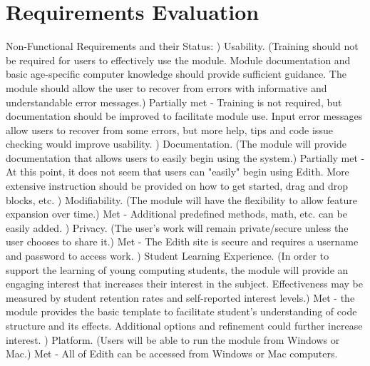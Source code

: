 \documentclass[a4paper]{article}
\begin{document}
\section{Requirements Evaluation}

Non-Functional Requirements and their Status: \newline {}) Usability.  (Training should not be required for users to effectively use the module.  
Module documentation and basic age-specific computer knowledge should provide sufficient guidance.
The module should allow the user to recover from errors with informative and understandable error messages.) Partially met - Training is not required, but documentation should be improved to facilitate module use.  Input error messages allow users to recover from some errors, but more help, tips and code issue checking would improve usability.  \newline {}) Documentation. (The module will provide documentation that allows users to easily begin using the system.) Partially met - At this point, it does not seem that users can "easily" begin using Edith.  More extensive instruction should be provided on how to get started, drag and drop blocks, etc.  \newline {}) Modifiability.  (The module will have the flexibility to allow feature expansion over time.) Met - Additional predefined methods, math, etc. can be easily added. \newline {}) Privacy.  (The user's work will remain private/secure unless the user chooses to share it.) Met - The Edith site is secure and requires a username and password to access work. \newline {}) Student Learning Experience.  (In order to support the learning of young computing students, the module will provide an engaging interest that increases their interest in the subject.  Effectiveness may be measured by student retention rates and self-reported interest levels.) Met - the module provides the basic template to facilitate student's understanding of code structure and its effects.  Additional options and refinement could further increase interest. \newline {}) Platform.  (Users will be able to run the module from Windows or Mac.)  Met - All of Edith can be accessed from Windows or Mac computers.  \newline \newline 
\end{document}
